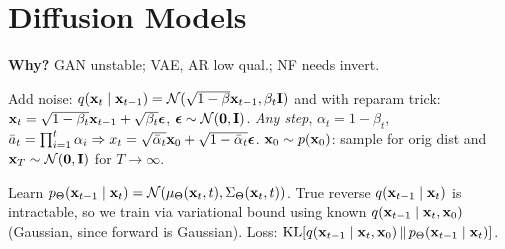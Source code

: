 \section{Diffusion Models}
\textbf{Why?} GAN unstable; VAE, AR low qual.; NF needs invert.

\begin{definition}[Diffusion]
    Add noise: \(q(\vb{x}_{t}\mid \vb{x}_{t-1}) = \operatorname{\mathcal{N}}(\sqrt{1 - \beta}\vb{x}_{t-1}, \beta_t \vb{I})\) and with reparam trick:
    \(\vb{x}_t = \sqrt{1 - \beta_t}\vb{x}_{t-1} + \sqrt{\beta_t}\vb*{\epsilon}\), \(\vb*{\epsilon} \sim \operatorname{\mathcal{N}}(\vb{0}, \vb{I})\).
    \textit{Any step}, \(\alpha_t = 1 - \beta_t\), \(\bar a_t = \prod_{i=1}^t \alpha_i \Rightarrow x_t = \sqrt{\bar\alpha_t}\vb{x}_0 + \sqrt{1 - \bar\alpha_t}\vb*{\epsilon}\).
    \(\vb{x}_0 \sim p(\vb{x}_0)\): sample for orig dist and \(\vb{x}_T \sim \operatorname{\mathcal{N}}(\vb{0}, \vb{I})\) for \(T \to \infty\).
\end{definition}


\begin{definition}[Denoising]
    Learn \(p_\Theta(\vb{x}_{t-1} \mid \vb{x}_{t}) = \operatorname{\mathcal{N}}(\mu_\Theta(\vb{x}_t, t), \Sigma_\Theta(\vb{x}_t, t))\). True reverse \(q(\vb{x}_{t-1} \mid \vb{x}_t)\) is intractable, so we train via variational bound using known \(q(\vb{x}_{t-1} \mid \vb{x}_t, \vb{x}_0)\) (Gaussian, since forward is Gaussian). Loss: \(\operatorname{KL}[q(\vb{x}_{t-1} \mid \vb{x}_t, \vb{x}_0) \,\|\, p_\Theta(\vb{x}_{t-1} \mid \vb{x}_t)]\).
\end{definition}


